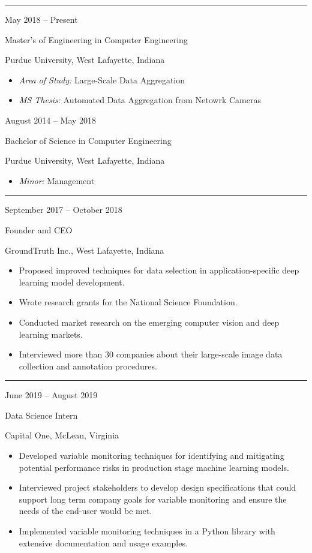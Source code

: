 \documentclass[10pt]{article}
\newlength{\cvcolumngapwidth}
\newlength{\cvleftcolumnwidth}
\newlength{\cvrightcolumnwidth}
\newcommand{\cvsectionstyle}[1]{{\normalsize\cvsectionfont\textcolor{cvsectioncolor}{#1}}}
\newcommand{\cvtitlestyle}[1]{{\large\cvtitlefont\textcolor{cvtitlecolor}{#1}}}
\newcommand{\cvdurationstyle}[1]{{\small\cvdurationfont\textcolor{cvdurationcolor}{#1}}}
\newlength{\cvafteritemskipamount}
\newlength{\cvaftersectionskipamount}
\newlength{\cvparskip}
\newcommand{\cvsection}[1]{
    \begin{minipage}[t]{\cvleftcolumnwidth}
        \raggedleft\cvsectionstyle{#1}
    \end{minipage}%
    \hspace{\cvcolumngapwidth}%
    \begin{minipage}[t]{\cvrightcolumnwidth}
        \textcolor{cvrulecolor}{\rule{\cvrightcolumnwidth}{0.3mm}}
    \end{minipage}

    \vspace{\cvaftersectionskipamount}
}
\newcommand{\cvitem}[2]{
    \begin{minipage}[t]{\cvleftcolumnwidth}
        \raggedleft #1
    \end{minipage}%
    \hspace{\cvcolumngapwidth}%
    \begin{minipage}[t]{\cvrightcolumnwidth}
        \setlength{\parskip}{\cvparskip} #2
    \end{minipage}

    \vspace{\cvafteritemskipamount}
}
\newcommand{\cvtitle}[1]{
    \cvtitlestyle{#1}

    \vspace{1mm plus 0.25mm minus 0.25mm}
    \vspace{-\cvparskip}
}
\begin{document}
\cvsection{EDUCATION}

\cvitem{
    \cvdurationstyle{May 2018 – Present}
}{
    \cvtitle{Master's of Engineering in Computer Engineering}

    Purdue University, West Lafayette, Indiana

    \begin{itemize}[leftmargin=*]
        \item \textit{Area of Study:} Large-Scale Data Aggregation
        \item \textit{MS Thesis:} Automated Data Aggregation from Netowrk Cameras
    \end{itemize}
}
\cvitem{
    \cvdurationstyle{August 2014 – May 2018}
}{
    \cvtitle{Bachelor of Science in Computer Engineering}

    Purdue University, West Lafayette, Indiana

    \begin{itemize}[leftmargin=*]
        \item \textit{Minor:} Management
    \end{itemize}
}

\cvsection{ENTREPRENURESHIP}

\cvitem{
    \cvdurationstyle{September 2017 – October 2018}
}{
    \cvtitle{Founder and CEO}

    GroundTruth Inc., West Lafayette, Indiana

    \begin{itemize}[leftmargin=*]
        \item Proposed improved techniques for data selection in application-specific deep learning model development.
        \item Wrote research grants for the National Science Foundation.
        \item Conducted market research on the emerging computer vision and deep learning markets.
        \item Interviewed more than 30 companies about their large-scale image data collection and annotation procedures. 
    \end{itemize}
}

\cvsection{WORK EXPERIENCE}

\cvitem{
    \cvdurationstyle{June 2019 – August 2019}
}{
    \cvtitle{Data Science Intern}

    Capital One, McLean, Virginia

    \begin{itemize}[leftmargin=*]
        \item Developed variable monitoring techniques for identifying and mitigating potential performance risks in production stage machine learning models.
        \item Interviewed project stakeholders to develop design specifications that could support long term company goals for variable monitoring and ensure the needs of the end-user would be met. 
        \item Implemented variable monitoring techniques in a Python library with extensive documentation and usage examples.
    \end{itemize}
}
\end{document}

